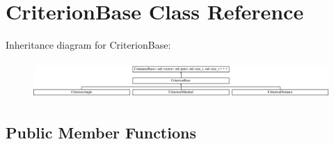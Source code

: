 \hypertarget{classCriterionBase}{}\section{Criterion\+Base Class Reference}
\label{classCriterionBase}
Inheritance diagram for Criterion\+Base\+:\begin{figure}[H]
\begin{center}
\leavevmode
\includegraphics[height=1.421320cm]{classCriterionBase}
\end{center}
\end{figure}
\subsection*{Public Member Functions}
